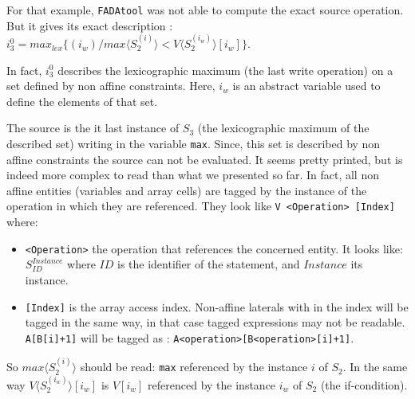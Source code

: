 For that example, \verb|FADAtool| was not able to compute the exact source operation. But it gives its exact description : $i_3^0 = max_{lex} \{ ( i_w ) / max \langle S_{2}^{(i)} \rangle  < V \langle S_{2}^{(i_w)} \rangle  [ i_w] \}$.

In fact, $i_3^0$ describes the lexicographic maximum (the last write operation) on a set defined by non affine constraints. Here, $i_w$ is an abstract variable used to define the elements of that set.

The source is the {it last} instance of $S_3$ (the lexicographic maximum of the described set) writing in the variable \verb|max|. Since, this set is described by non affine constraints the source can not be evaluated.
It seems pretty printed, but is indeed more complex to read than what we presented so far.
In fact, all non affine entities (variables and array cells) are tagged by the instance of the operation in which they are referenced.
They look like \verb|V <Operation> [Index]| where:
\begin{itemize}
 \item \verb|<Operation>| the operation that references the concerned entity. It looks like: $S_{ID}^{Instance}$  where $ID$ is the identifier of the statement, and $Instance$ its instance.
\item \verb|[Index]| is the array access index. Non-affine laterals with in the index will be tagged in the same way, in that case tagged expressions may not be readable. \verb|A[B[i]+1]| will be tagged as : \verb|A<operation>[B<operation>[i]+1]|.
\end{itemize}


So $max \langle S_{2}^{(i)}\rangle$ should be read: \verb|max| referenced by the instance $i$ of $S_2$. In the same way $V \langle S_{2}^{(i_w)} \rangle  [ i_w]$ is $V[i_w]$ referenced by the instance $i_w$ of $S_2$ (the if-condition).




